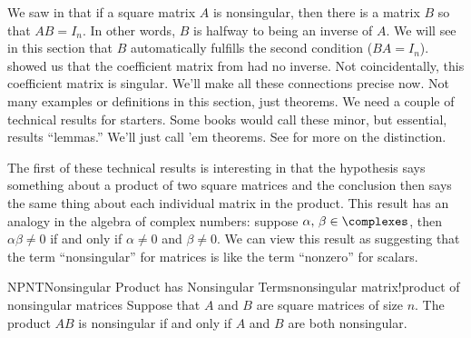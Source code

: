 %
We saw in  that if a square matrix $A$ is nonsingular, then there is a matrix $B$ so that $AB=I_n$.  In other words, $B$ is halfway to being an inverse of $A$.  We will see in this section that $B$ automatically fulfills the second condition ($BA=I_n$).   showed us that the coefficient matrix from  had no inverse.  Not coincidentally, this coefficient matrix is singular.  We'll make all these connections precise now.  Not many examples or definitions in this section, just theorems.
%
%
We need a couple of technical results for starters.  Some books would call these minor, but essential, results ``lemmas.''  We'll just call 'em theorems.
{\relax}
{See  for more on the distinction.}\par
%
The first of these technical results is interesting in that the hypothesis says something about a product of two square matrices and the conclusion then says the same thing about each individual matrix in the product.  This result has an analogy in the algebra of complex numbers: suppose $\alpha,\,\beta\in\complexes$, then $\alpha\beta\neq 0$ if and only if $\alpha\neq 0$ and $\beta\neq 0$.  We can view this result as suggesting that the term ``nonsingular'' for matrices is like the term ``nonzero'' for scalars.
%
\begin{theorem}{NPNT}{Nonsingular Product has Nonsingular Terms}{nonsingular matrix!product of nonsingular matrices}
%
Suppose that $A$ and $B$ are square matrices of size $n$.  The product $AB$ is nonsingular if and only if $A$ and $B$ are both nonsingular.
\end{theorem}
%
